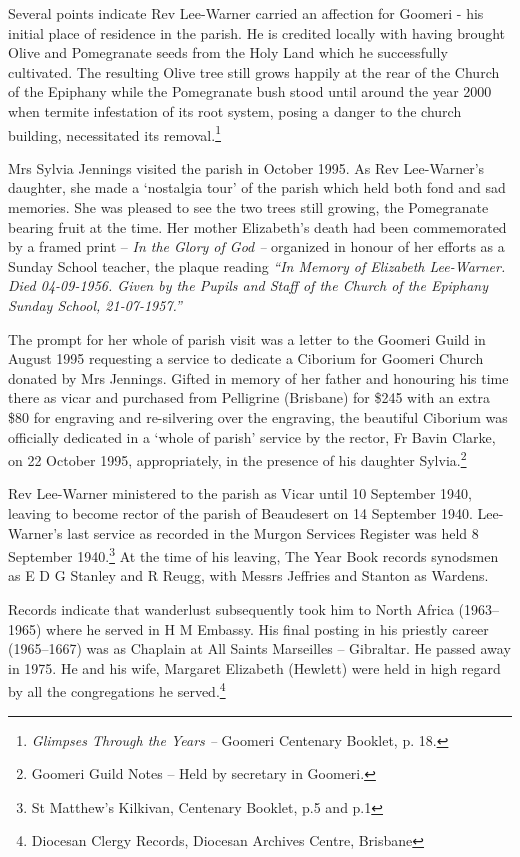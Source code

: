 Several points indicate Rev Lee-Warner carried an affection for Goomeri - his initial place of residence in the parish. He is credited locally with having brought Olive and Pomegranate seeds from the Holy Land which he successfully cultivated. The resulting Olive tree still grows happily at the rear of the Church of the Epiphany while the Pomegranate bush stood until around the year 2000 when termite infestation of its root system, posing a danger to the church building, necessitated its removal.\footnote{\emph{Glimpses Through the Years --} Goomeri Centenary Booklet, p. 18.}


Mrs Sylvia Jennings visited the parish in October 1995. As Rev Lee-Warner's daughter, she made a `nostalgia tour' of the parish which held both fond and sad memories. She was pleased to see the two trees still growing, the Pomegranate bearing fruit at the time. Her mother Elizabeth's death had been commemorated by a framed print -- \emph{In the Glory of God --} organized in honour of her efforts as a Sunday School teacher, the plaque reading \emph{``In Memory of Elizabeth Lee-Warner. Died 04-09-1956. Given by the Pupils and Staff of the Church of the Epiphany Sunday School, 21-07-1957.''}



The prompt for her whole of parish visit was a letter to the Goomeri Guild in August 1995 requesting a service to dedicate a Ciborium for Goomeri Church donated by Mrs Jennings. Gifted in memory of her father and honouring his time there as vicar and purchased from Pelligrine (Brisbane) for \$245 with an extra \$80 for engraving and re-silvering over the engraving, the beautiful Ciborium was officially dedicated in a `whole of parish' service by the rector, Fr Bavin Clarke, on 22 October 1995, appropriately, in the presence of his daughter Sylvia.\footnote{Goomeri Guild Notes -- Held by secretary in Goomeri.}


\balance


Rev Lee-Warner ministered to the parish as Vicar until 10 September 1940, leaving to become rector of the parish of Beaudesert on 14 September 1940. Lee-Warner's last service as recorded in the Murgon Services Register was held 8 September 1940.\footnote{St Matthew's Kilkivan, Centenary Booklet, p.5 and p.1} At the time of his leaving, The Year Book records synodsmen as E D G Stanley and R Reugg, with Messrs Jeffries and Stanton as Wardens.


Records indicate that wanderlust subsequently took him to North Africa (1963--1965) where he served in H M Embassy. His final posting in his priestly career (1965--1667) was as Chaplain at All Saints Marseilles -- Gibraltar. He passed away in 1975. He and his wife, Margaret Elizabeth (Hewlett) were held in high regard by all the congregations he served.\footnote{Diocesan Clergy Records, Diocesan Archives Centre, Brisbane}


